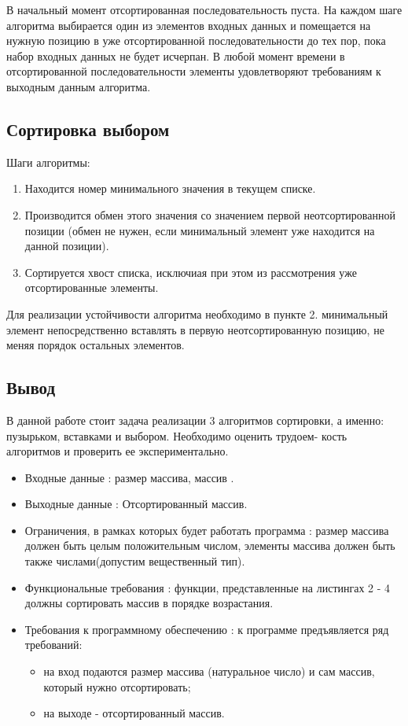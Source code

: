 \documentclass[14pt,russian]{scrartcl}
\begin{document}
В начальный момент отсортированная последовательность пуста. На каждом шаге алгоритма выбирается один из элементов входных данных и помещается на нужную позицию в уже отсортированной последовательности до тех пор, пока набор входных данных не будет исчерпан. В любой момент времени в отсортированной последовательности элементы удовлетворяют требованиям к выходным данным алгоритма.

\subsection{Сортировка выбором}

Шаги алгоритмы:

\begin{enumerate}
    \item Находится номер минимального значения в текущем списке.
    \item Производится обмен этого значения со значением первой неотсортированной позиции (обмен не нужен, если минимальный элемент уже находится на данной позиции).
    \item Сортируется хвост списка, исключиая при этом из рассмотрения уже отсортированные элементы.
\end{enumerate}

Для реализации устойчивости алгоритма необходимо в пункте 2. минимальный элемент непосредственно вставлять в первую неотсортированную позицию, не меняя порядок остальных элементов.

\subsection*{Вывод}

В данной работе стоит задача реализации 3 алгоритмов сортировки, а именно: пузырьком, вставками и выбором. Необходимо оценить трудоем- кость алгоритмов и проверить ее экспериментально.
\begin{itemize}
	\item Входные данные : размер массива, массив . 
	\item Выходные данные : Отсортированный массив.
	\item Ограничения, в рамках которых будет работать программа : размер массива должен быть целым положительным числом, элементы массива должен быть также числами(допустим вещественный тип).
	\item Функциональные требования : функции, представленные на листингах 2 - 4 должны сортировать массив в порядке возрастания.
	\item Требования к программному обеспечению : к программе предъявляется ряд требований:
			\begin{itemize}
			    \item на вход подаются размер массива (натуральное число) и сам массив, который нужно отсортировать;
			    \item на выходе - отсортированный массив.
			\end{itemize}
\end{itemize}
\end{document}
